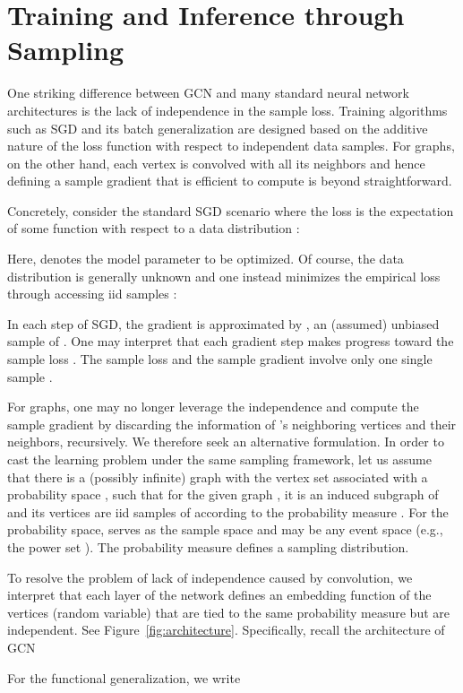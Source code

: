 \documentclass{article} \usepackage{iclr2018_conference,times}
\theoremstyle{plain}\newtheorem{theorem}{Theorem}\theoremstyle{plain}\newtheorem{proposition}[theorem]{Proposition}
\theoremstyle{plain}\newtheorem{corollary}[theorem]{Corollary}
\theoremstyle{plain}\newtheorem{lemma}[theorem]{Lemma}
\begin{document}
\section{Training and Inference through Sampling}\label{sec:sampling}

One striking difference between GCN and many standard neural network architectures is the lack of independence in the sample loss. Training algorithms such as SGD and its batch generalization are designed based on the additive nature of the loss function with respect to independent data samples. For graphs, on the other hand, each vertex is convolved with all its neighbors and hence defining a sample gradient that is efficient to compute is beyond straightforward.

Concretely, consider the standard SGD scenario where the loss is the expectation of some function  with respect to a data distribution :

Here,  denotes the model parameter to be optimized. Of course, the data distribution is generally unknown and one instead minimizes the empirical loss through accessing  iid samples :

In each step of SGD, the gradient is approximated by , an (assumed) unbiased sample of . One may interpret that each gradient step makes progress toward the sample loss . The sample loss and the sample gradient involve only one single sample .

For graphs, one may no longer leverage the independence and compute the sample gradient  by discarding the information of 's neighboring vertices and their neighbors, recursively. We therefore seek an alternative formulation. In order to cast the learning problem under the same sampling framework, let us assume that there is a (possibly infinite) graph  with the vertex set  associated with a probability space , such that for the given graph , it is an induced subgraph of  and its vertices are iid samples of  according to the probability measure . For the probability space,  serves as the sample space and  may be any event space (e.g., the power set ). The probability measure  defines a sampling distribution.

To resolve the problem of lack of independence caused by convolution, we interpret that each layer of the network defines an embedding function of the vertices (random variable) that are tied to the same probability measure but are independent. See Figure~\ref{fig:architecture}. Specifically, recall the architecture of GCN

For the functional generalization, we write
\end{document}
